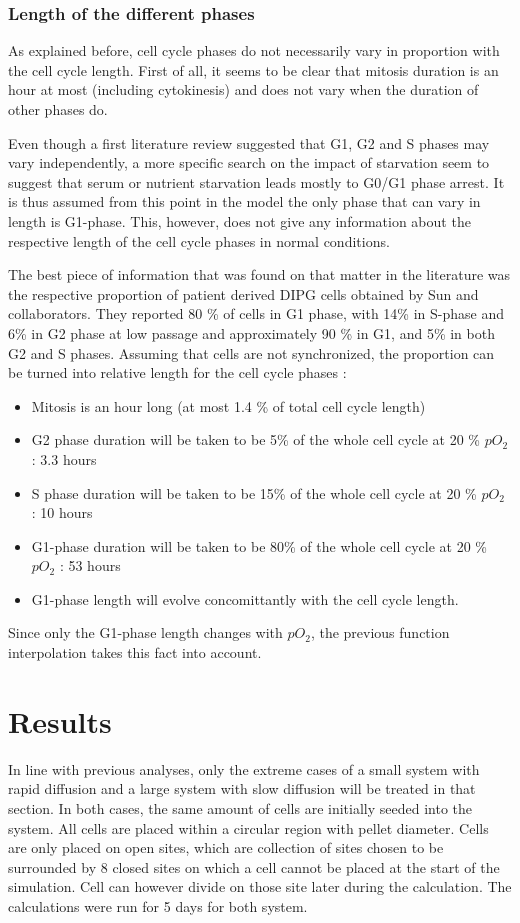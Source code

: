 \documentclass[11pt,a4paper]{article}
\begin{document}
\subsubsection{Length of the different phases}
As explained before, cell cycle phases do not necessarily vary in proportion with the cell cycle length. First of all, it seems to be clear that mitosis duration is an hour at most (including cytokinesis)\cite{Cooper2006}\cite{Araujo2016}\cite{Chao2019} and does not vary when the duration of other phases do.

Even though a first literature review suggested that G1, G2 and S phases may vary independently\cite{Chao2019}\cite{Fisher2022}, a more specific search on the impact of starvation seem to suggest that serum or nutrient starvation leads mostly to G0/G1 phase arrest.\cite{Wang2021}\cite{Chen2012}\cite{Hahn2009} It is thus assumed from this point in the model the only phase that can vary in length is G1-phase. This, however, does not give any information about the respective length of the cell cycle phases in normal conditions.

The best piece of information that was found on that matter in the literature was the respective proportion of patient derived DIPG cells obtained by Sun and collaborators. They reported 80 \% of cells in G1 phase, with 14\% in S-phase and 6\% in G2 phase at low passage and approximately 90 \% in G1, and 5\% in both G2 and S phases.\cite{Sun2019} Assuming that cells are not synchronized, the proportion can be turned into relative length for the cell cycle phases : 
\begin{itemize}
\item Mitosis is an hour long (at most 1.4 \% of total cell cycle length)
\item G2 phase duration will be taken to be 5\% of the whole cell cycle at 20 \% $pO_2$ : 3.3 hours
\item S phase duration will be taken to be 15\% of the whole cell cycle at 20 \% $pO_2$ : 10 hours
\item G1-phase duration will be taken to be 80\% of the whole cell cycle at 20 \% $pO_2$ : 53 hours
\item G1-phase length will evolve concomittantly with the cell cycle length.
\end{itemize}

Since only the G1-phase length changes with $pO_2$, the previous function interpolation takes this fact into account.

\section{Results}
In line with previous analyses, only the extreme cases of a small system with rapid diffusion and a large system with slow diffusion will be treated in that section. In both cases, the same amount of cells are initially seeded into the system. All cells are placed within a circular region with pellet diameter. Cells are only placed on open sites, which are collection of sites chosen to be surrounded by 8 closed sites on which a cell cannot be placed at the start of the simulation. Cell can however divide on those site later during the calculation. The calculations were run for 5 days for both system.
\end{document}
